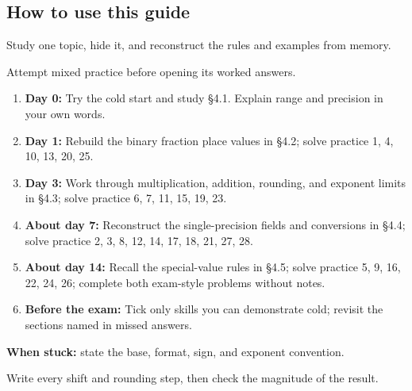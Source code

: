 \documentclass[11pt]{article}
\begin{document}
\begin{keepsection}
\section{How to use this guide}

Study one topic, hide it, and reconstruct the rules and examples from memory.

Attempt mixed practice before opening its worked answers.

\begin{enumerate}
\item \textbf{Day 0:} Try the cold start and study §4.1. Explain range and precision in your own words.
\item \textbf{Day 1:} Rebuild the binary fraction place values in §4.2; solve practice 1, 4, 10, 13, 20, 25.
\item \textbf{Day 3:} Work through multiplication, addition, rounding, and exponent limits in §4.3; solve practice 6, 7, 11, 15, 19, 23.
\item \textbf{About day 7:} Reconstruct the single-precision fields and conversions in §4.4; solve practice 2, 3, 8, 12, 14, 17, 18, 21, 27, 28.
\item \textbf{About day 14:} Recall the special-value rules in §4.5; solve practice 5, 9, 16, 22, 24, 26; complete both exam-style problems without notes.
\item \textbf{Before the exam:} Tick only skills you can demonstrate cold; revisit the sections named in missed answers.
\end{enumerate}

\begin{notebox}\textbf{When stuck:} state the base, format, sign, and exponent convention.\end{notebox}

Write every shift and rounding step, then check the magnitude of the result.
\end{keepsection}
\end{document}
